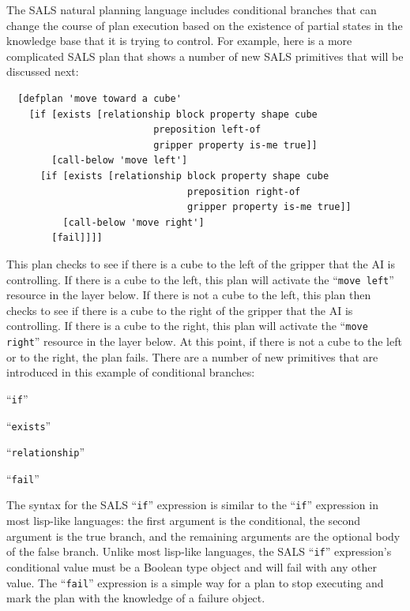 The SALS natural planning language includes conditional branches that
can change the course of plan execution based on the existence of
partial states in the knowledge base that it is trying to control.
For example, here is a more complicated SALS plan that shows a number
of new SALS primitives that will be discussed next:
\begin{samepage}
\begin{Verbatim}
  [defplan 'move toward a cube'
    [if [exists [relationship block property shape cube
	                      preposition left-of
	                      gripper property is-me true]]
        [call-below 'move left']
      [if [exists [relationship block property shape cube
                                preposition right-of
                                gripper property is-me true]]
          [call-below 'move right']
        [fail]]]]
\end{Verbatim}
\end{samepage}
This plan checks to see if there is a cube to the left of the gripper
that the AI is controlling.  If there is a cube to the left, this plan
will activate the ``{\tt{move left}}'' resource in the layer below.
If there is not a cube to the left, this plan then checks to see if
there is a cube to the right of the gripper that the AI is
controlling.  If there is a cube to the right, this plan will activate
the ``{\tt{move right}}'' resource in the layer below.  At this point,
if there is not a cube to the left or to the right, the plan fails.
There are a number of new primitives that are introduced in this
example of conditional branches:
\begin{packed_itemize}
\item{``{\tt{if}}''}
\item{``{\tt{exists}}''}
\item{``{\tt{relationship}}''}
\item{``{\tt{fail}}''}
\end{packed_itemize}
The syntax for the SALS ``{\tt{if}}'' expression is similar to the
``{\tt{if}}'' expression in most lisp-like languages: the first
argument is the conditional, the second argument is the true branch,
and the remaining arguments are the optional body of the false branch.
Unlike most lisp-like languages, the SALS ``{\tt{if}}'' expression's
conditional value must be a Boolean type object and will fail with any
other value.  The ``{\tt{fail}}'' expression is a simple way for a
plan to stop executing and mark the plan with the knowledge of a
failure object.

